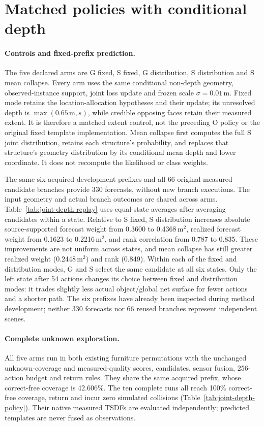 \section{Matched policies with conditional depth}
\label{sec:joint-depth-policy}

\paragraph{Controls and fixed-prefix prediction.}
The five declared arms are G fixed, S fixed, G distribution, S distribution
and S mean collapse. Every arm uses the same conditional non-depth geometry,
observed-instance support, joint loss update and frozen scale
$\sigma=0.01$\,m. Fixed mode retains the location-allocation hypotheses and
their update; its unresolved depth is $\max(0.65\,\mathrm{m},s)$, while
credible opposing faces retain their measured extent. It is therefore a
matched extent control, not the preceding O policy or the original fixed
template implementation. Mean collapse first computes the full S joint
distribution, retains each structure's probability, and replaces that
structure's geometry distribution by its conditional mean depth and lower
coordinate. It does not recompute the likelihood or class weights.

The same six acquired development prefixes and all 66 original measured
candidate branches provide 330 forecasts, without new branch executions.
The input geometry and actual branch outcomes are shared across arms.
Table~\ref{tab:joint-depth-replay} uses equal-state averages after averaging
candidates within a state. Relative to S fixed, S distribution increases
absolute source-supported forecast weight from 0.3600 to 0.4368\,m$^2$,
realized forecast weight from 0.1623 to 0.2216\,m$^2$, and rank correlation
from 0.787 to 0.835. These improvements are not uniform across states, and
mean collapse has still greater realized weight (0.2448\,m$^2$) and rank
(0.849). Within each of the fixed and distribution modes, G and S select
the same candidate at all six states. Only the left state after 54 actions
changes its choice between fixed and distribution modes: it trades slightly
less actual object/global net surface for fewer actions and a shorter path.
The six prefixes have already been inspected during method development;
neither 330 forecasts nor 66 reused branches represent independent scenes.

\paragraph{Complete unknown exploration.}
All five arms run in both existing furniture permutations with the unchanged
unknown-coverage and measured-quality scores, candidates, sensor fusion,
256-action budget and return rules. They share the same acquired prefix,
whose correct-free coverage is 42.606\%. The ten complete runs all reach
100\% correct-free coverage, return and incur zero simulated collisions
(Table~\ref{tab:joint-depth-policy}). Their native measured TSDFs are
evaluated independently; predicted templates are never fused as observations.

